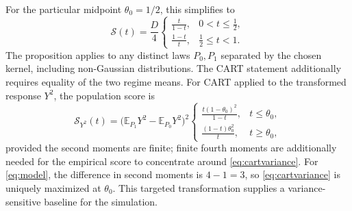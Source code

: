 \documentclass[12pt,a4paper]{article}
\newcommand{\E}{\mathbb E}
\newcommand{\1}{\mathbf 1}
\begin{document}
For the particular midpoint $\theta_0=1/2$, this simplifies to
\begin{equation}\label{eq:midpointscore}
 \mathcal S(t)=\frac D4\begin{cases}
 \displaystyle \frac{t}{1-t},&0<t\le\frac12,\\[5pt]
 \displaystyle \frac{1-t}{t},&\frac12\le t<1.
 \end{cases}
\end{equation}
The proposition applies to any distinct laws $P_0,P_1$ separated by the chosen kernel, including non-Gaussian distributions. The CART statement additionally requires equality of the two regime means. For CART applied to the transformed response $Y^2$, the population score is
\begin{equation}\label{eq:cartvariance}
 \mathcal S_{Y^2}(t)=\bigl(\E_{P_1}Y^2-\E_{P_0}Y^2\bigr)^2
 \begin{cases}
 \displaystyle\frac{t(1-\theta_0)^2}{1-t},&t\le\theta_0,\\[4pt]
 \displaystyle\frac{(1-t)\theta_0^2}{t},&t\ge\theta_0,
 \end{cases}
\end{equation}
provided the second moments are finite; finite fourth moments are additionally needed for the empirical score to concentrate around \eqref{eq:cartvariance}. For \eqref{eq:model}, the difference in second moments is $4-1=3$, so \eqref{eq:cartvariance} is uniquely maximized at $\theta_0$. This targeted transformation supplies a variance-sensitive baseline for the simulation.
\end{document}
